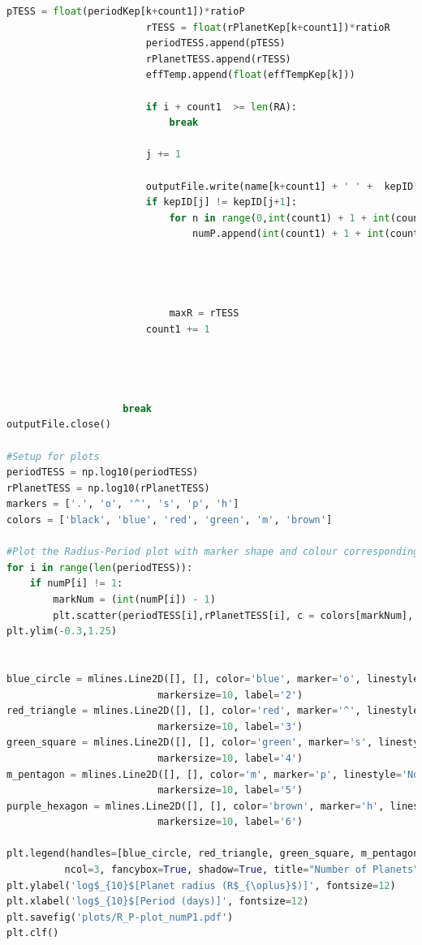 \documentclass[12pt]{report}
\begin{document}
\begin{appendix}
\begin{lstlisting}[language=Python]
						pTESS = float(periodKep[k+count1])*ratioP
						rTESS = float(rPlanetKep[k+count1])*ratioR
						periodTESS.append(pTESS)
						rPlanetTESS.append(rTESS)
						effTemp.append(float(effTempKep[k]))
							
						if i + count1  >= len(RA):
							break
							
						j += 1		
						
						outputFile.write(name[k+count1] + ' ' +  kepID[k+count1] + ' ' + str(pTESS) + ' ' + str(rTESS) + ' ' + mStar[k+count1] + ' ' + numEpoch[k+count1] + ' '  + transitDur[k+count1] + ' ' + rStar[k+count1] + ' ' + str(RA[i+count1]) + ' ' + str(dec[i+count1]) + ' ' + effTempKep[k+count1] + ' ' + str(effTempSul[i+count1]) + ' ' + str(ICMag[i+count1]) + '\n')
						if kepID[j] != kepID[j+1]:
							for n in range(0,int(count1) + 1 + int(countP)):
								numP.append(int(count1) + 1 + int(countP))

								
								

							maxR = rTESS
						count1 += 1

						
						
		
					break
outputFile.close()

#Setup for plots					
periodTESS = np.log10(periodTESS)
rPlanetTESS = np.log10(rPlanetTESS)	
markers = ['.', 'o', '^', 's', 'p', 'h']
colors = ['black', 'blue', 'red', 'green', 'm', 'brown']

#Plot the Radius-Period plot with marker shape and colour corresponding to the multiplicity of the system.
for i in range(len(periodTESS)):
	if numP[i] != 1:
		markNum = (int(numP[i]) - 1)
		plt.scatter(periodTESS[i],rPlanetTESS[i], c = colors[markNum], marker=markers[markNum], edgecolor='black', label=numP, alpha=0.6)
plt.ylim(-0.3,1.25)


blue_circle = mlines.Line2D([], [], color='blue', marker='o', linestyle='None',
                          markersize=10, label='2')
red_triangle = mlines.Line2D([], [], color='red', marker='^', linestyle='None',
                          markersize=10, label='3')
green_square = mlines.Line2D([], [], color='green', marker='s', linestyle='None',
                          markersize=10, label='4')
m_pentagon = mlines.Line2D([], [], color='m', marker='p', linestyle='None',
                          markersize=10, label='5')
purple_hexagon = mlines.Line2D([], [], color='brown', marker='h', linestyle='None',
                          markersize=10, label='6')
                          
plt.legend(handles=[blue_circle, red_triangle, green_square, m_pentagon, purple_hexagon] ,loc='upper center', bbox_to_anchor=(0.5, 1.15),
          ncol=3, fancybox=True, shadow=True, title="Number of Planets")
plt.ylabel('log$_{10}$[Planet radius (R$_{\oplus}$)]', fontsize=12)
plt.xlabel('log$_{10}$[Period (days)]', fontsize=12)
plt.savefig('plots/R_P-plot_numP1.pdf')
plt.clf()
\end{lstlisting}

\end{appendix}
\end{document}
